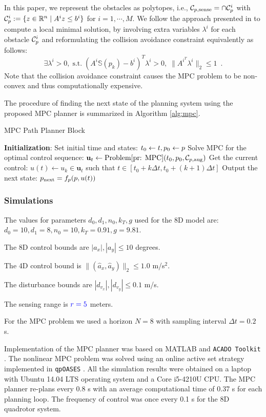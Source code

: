 In this paper, we represent the obstacles as polytopes, i.e., $\mathcal C_{p,\text{sense}} = \cap \mathcal C_p^{i}$ with $\mathcal C_p^{i}:= \{z\in\mathbb{R}^{n} \mid A^{i}z\leq b^{i}\}$ for $i = 1,\cdots ,M$. We follow the approach presented in \cite{Zhang2017} to compute a local minimal solution, by involving extra variables $\lambda^{i}$ for each obstacle $\mathcal C_p^{i}$ and reformulating the collision avoidance constraint equivalently as follows: 
%
\begin{equation}
\exists \lambda^{i} >0, \; \mbox{s.t.} \; (A^{i} \mathbb{S}(p_k) - b^{i})^{T}\lambda^{i}  > 0, \; \|A^{i^{T}}\lambda^{i}\|_2\leq 1\enspace .
\end{equation}
%
Note that the collision avoidance constraint causes the MPC problem to be non-convex and thus computationally expensive.

The procedure of finding the next state of the planning system using the proposed MPC planner is summarized in Algorithm \ref{alg:mpc}.
%
\begin{algorithm}	
	\caption{MPC Path Planner Block}
	\label{alg:mpc}
	\begin{algorithmic}[1]
		\STATE \textbf{Initialization}:
 		\STATE Set initial time and states: $t_0 \leftarrow t, p_0 \leftarrow p$
			\STATE Solve MPC for the optimal control sequence: $\mathbf{u}_t \leftarrow \text{Problem\ref{pr: MPC}} (t_0,p_0,\mathcal C_{p,\text{aug}})$
		\ENDIF
        \STATE Get the current control: $u(t) \leftarrow u_k \in \mathbf{u}_t$ such that $t \in [t_0 + k \Delta t, t_0 + (k+1) \Delta t]$
		\STATE Output the next state: $p_\text{next} = f_p(p,u(t))$
	\end{algorithmic}
\end{algorithm}

\subsubsection{Simulations}

The values for parameters $d_0,d_1,n_0,k_T,g$ used for the 8D model are: $d_0=10,d_1=8,n_0=10,k_T=0.91,g=9.81$.

The 8D control bounds are $|a_x|,|a_y|\leq10$ degrees.

The 4D control bound is $\|(\hat a_x,\hat a_y)\|_2\leq1.0$ m/s$^{2}$.

The disturbance bounds are $|d_{v_x}|,|d_{v_y}|\leq0.1$ m/s.

The sensing range is $\textcolor{blue}{r = 5}$ meters.

For the MPC problem we used a horizon $N=8$ with sampling interval $\Delta t = 0.2$ s.

Implementation of the MPC planner was based on MATLAB and \texttt{ACADO Toolkit} \cite{Houska2011a}. The nonlinear MPC problem was solved using an online active set strategy implemented in \texttt{qpOASES} \cite{Ferreau2014}. All the simulation results were obtained on a laptop with Ubuntu 14.04 LTS operating system and a Core i5-4210U CPU. The MPC planner re-plans every 0.8 s with an average computational time of 0.37 s for each planning loop. The frequency of control was once every 0.1 s for the 8D quadrotor system.

